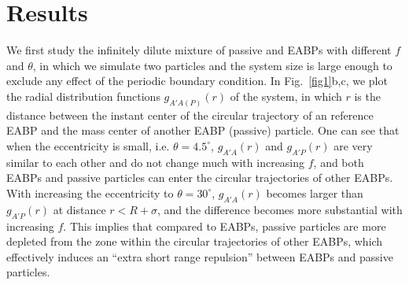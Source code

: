 \documentclass[prl, twocolumn, showpacs, preprintnumbers,amsmath,amssymb]{revtex4-1}
\begin{document}
\section{Results}
We first study the infinitely dilute mixture of passive and EABPs with different $f$ and $\theta$, in which we simulate two particles and the system size is large enough to exclude any effect of the periodic boundary condition. 
In Fig.~\ref{fig1}b,c, we plot the radial distribution functions $g_{A'A(P)}(r)$ of the system, in which $r$ is the distance between the instant center of the circular trajectory of an reference EABP and the mass center of another EABP (passive) particle.
One can see that when the eccentricity is small, i.e. $\theta= 4.5^{\circ}$, $g_{A'A}(r)$ and $g_{A'P}(r)$ are very similar to each other and do not change much with increasing $f$, and both EABPs and passive particles can enter the circular trajectories of other EABPs. With increasing the eccentricity to $\theta = 30^{\circ}$, $g_{A'A}(r)$ becomes larger than $g_{A'P}(r)$ at distance $r < R+\sigma$, and the difference becomes more substantial with increasing $f$.
This implies that compared to EABPs, passive particles are more depleted from the zone within the circular trajectories of other EABPs, which effectively induces an ``extra short range repulsion'' between EABPs and passive particles.
\end{document}
